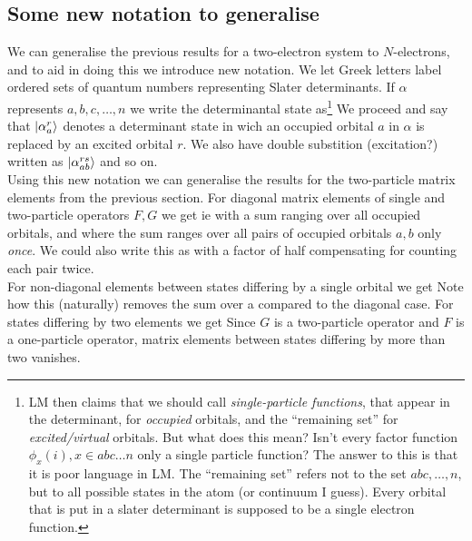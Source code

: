 \subsection{Some new notation to generalise}
We can generalise the previous results for a two-electron system to $N$-electrons, and to aid in doing this we introduce new notation. We let Greek letters label ordered sets of quantum numbers representing Slater determinants. If $\alpha$ represents $a,b,c,\dots,n$ we write the determinantal state as\footnote{LM then claims that we should call \emph{single-particle functions}, that appear in the determinant, for \emph{occupied} orbitals, and the ``remaining set'' for \emph{excited/virtual} orbitals. But what does this mean? Isn't every factor function $\phi_x(i), x \in abc\dots n$ only a single particle function? The answer to this is that it is poor language in LM. The ``remaining set'' refers not to the set $abc,\dots,n$, but to all possible states in the atom (or continuum I guess). Every orbital that is put in a slater determinant is supposed to be a single electron function.}
\indent We proceed and say that $\ket{\alpha_a^r}$ denotes a determinant state in wich an occupied orbital $a$ in $\alpha$ is replaced by an excited orbital $r$. We also have double substition (excitation?) written as $\ket{\alpha_{ab}^{rs}}$ and so on.\\
\indent Using this new notation we can generalise the results for the two-particle matrix elements from the previous section. For diagonal matrix elements of single and two-particle operators $F,G$ we get
ie with a sum ranging over all occupied orbitals, and
where the sum ranges over all pairs of occupied orbitals $a,b$ only \emph{once}. We could also write this as
with a factor of half compensating for counting each pair twice.\\
\indent For non-diagonal elements between states differing by a single orbital we get
Note how this (naturally) removes the sum over a compared to the diagonal case. For states differing by two elements we get
Since $G$ is a two-particle operator and $F$ is a one-particle operator, matrix elements between states differing by more than two vanishes.
